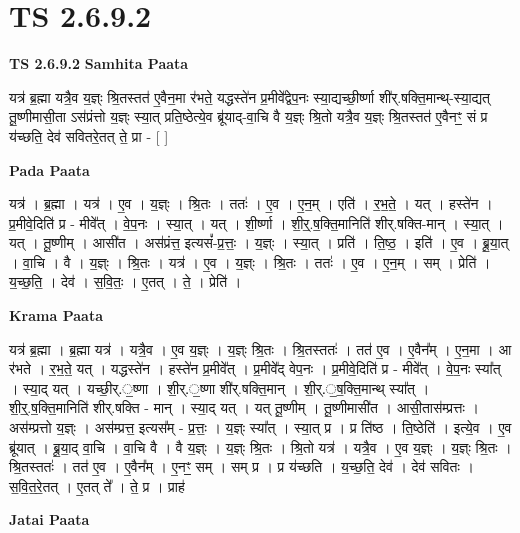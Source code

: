 \documentclass[17pt]{extarticle}
\begin{document}
\section*{ TS 2.6.9.2 }

\textbf{TS 2.6.9.2 } \newline
\textbf{Samhita Paata} \newline

यत्र॑ ब्र॒ह्मा यत्रै॒व य॒ज्ञ्ः श्रि॒तस्तत॑ ए॒वैन॒मा र॑भते॒ यद्धस्ते॑न प्र॒मीवे᳚द्वेप॒नः स्या॒द्यच्छी॒र्ष्णा शी॑र्.षक्ति॒मान्थ्-स्या॒द्यत् तू॒ष्णीमासी॒ता ऽस॑प्रंत्तो य॒ज्ञ्ः स्या॒त् प्रति॒ष्ठेत्ये॒व ब्रू॑याद्-वा॒चि वै य॒ज्ञ्ः श्रि॒तो यत्रै॒व य॒ज्ञ्ः श्रि॒तस्तत॑ ए॒वैनꣳ॒॒ सं प्र य॑च्छति॒ देव॑ सवितरे॒तत् ते॒ प्रा - [  ] \newline

\textbf{Pada Paata} \newline

यत्र॑ । ब्र॒ह्मा । यत्र॑ । ए॒व । य॒ज्ञ्ः । श्रि॒तः । ततः॑ । ए॒व । ए॒न॒म् । एति॑ । र॒भ॒ते॒ । यत् । हस्ते॑न । प्र॒मीवे॒दिति॑ प्र - मीवे᳚त् । वे॒प॒नः । स्या॒त् । यत् । शी॒र्ष्णा । शी॒र्॒.ष॒क्ति॒मानिति॑ शीर्.षक्ति-मान् । स्या॒त् । यत् । तू॒ष्णीम् । आसी॑त । अस॑प्रंत्त॒ इत्यसं᳚-प्र॒त्तः॒ । य॒ज्ञ्ः । स्या॒त् । प्रति॑ । ति॒ष्ठ॒ । इति॑ । ए॒व । ब्रू॒या॒त् । वा॒चि । वै । य॒ज्ञ्ः । श्रि॒तः । यत्र॑ । ए॒व । य॒ज्ञ्ः । श्रि॒तः । ततः॑ । ए॒व । ए॒न॒म् । सम् । प्रेति॑ । य॒च्छ॒ति॒ । देव॑ । स॒वि॒तः॒ । ए॒तत् । ते॒ । प्रेति॑ ।  \newline


\textbf{Krama Paata} \newline

यत्र॑ ब्र॒ह्मा । ब्र॒ह्मा यत्र॑ । यत्रै॒व । ए॒व य॒ज्ञ्ः । य॒ज्ञ्ः श्रि॒तः । श्रि॒तस्ततः॑ । तत॑ ए॒व । ए॒वैन᳚म् । ए॒न॒मा । आ र॑भते । र॒भ॒ते॒ यत् । यद्धस्ते॑न । हस्ते॑न प्र॒मीवे᳚त् । प्र॒मीवे᳚द् वेप॒नः । प्र॒मीवे॒दिति॑ प्र - मीवे᳚त् । वे॒प॒नः स्या᳚त् । स्या॒द् यत् । यच्छी॒र्.॒ष्णा । शी॒र्.॒ष्णा शी॑र्.षक्ति॒मान् । शी॒र्.॒ष॒क्ति॒मान्थ् स्या᳚त् । शी॒र्॒.ष॒क्ति॒मानिति॑ शीर्.षक्ति - मान् । स्या॒द् यत् । यत् तू॒ष्णीम् । तू॒ष्णीमासी॑त । आसी॒तास॑म्प्रत्तः । अस॑म्प्रत्तो य॒ज्ञ्ः । अस॑म्प्रत्त॒ इत्यस᳚म् - प्र॒त्तः॒ । य॒ज्ञ्ः स्या᳚त् । स्या॒त् प्र । प्र ति॑ष्ठ । ति॒ष्ठेति॑ । इत्ये॒व । ए॒व ब्रू॑यात् । ब्रू॒या॒द् वा॒चि । वा॒चि वै । वै य॒ज्ञ्ः । य॒ज्ञ्ः श्रि॒तः । श्रि॒तो यत्र॑ । यत्रै॒व । ए॒व य॒ज्ञ्ः । य॒ज्ञ्ः श्रि॒तः । श्रि॒तस्ततः॑ । तत॑ ए॒व । ए॒वैन᳚म् । ए॒नꣳ॒॒ सम् । सम् प्र । प्र य॑च्छति । य॒च्छ॒ति॒ देव॑ । देव॑ सवितः । स॒वि॒त॒रे॒तत् । ए॒तत् ते᳚ । ते॒ प्र । प्राह॑ \newline

\textbf{Jatai Paata} \newline
\end{document}
